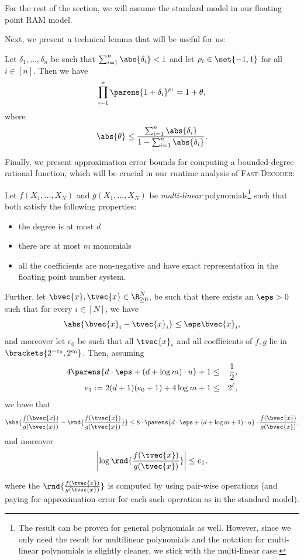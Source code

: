 \documentclass[11pt]{article}
\begin{document}
For the rest of the section, we will assume the standard model in our floating point RAM model.

Next, we present a technical lemma that will be useful for us:
\begin{lemma}
\label{lem:higham-bound}
    Let $\delta_1,\dots,\delta_n$ be such that $\sum_{i=1}^n  \abs{\delta_i}<1$ and let $\rho_i\in \set{-1,1}$ for all $i\in [n]$. Then we have
    \[\prod_{i=1}^n \parens{1+\delta_i}^{\rho_i} = 1 +\theta,\]
    where
    \[\abs{\theta} \le \frac{\sum_{i=1}^n  \abs{\delta_i}}{1-\sum_{i=1}^n  \abs{\delta_i}}.\]
\end{lemma}

Finally, we present approximation error bounds for computing a bounded-degree rational function, which will be crucial in our runtime analysis of \textsc{Fast-Decoder}:
\begin{lemma}
    \label{lem:rational-fn-error}
Let $f(X_1,\dots,X_N)$ and $g(X_1,\dots,X_N)$ be {\em multi-linear} polynomials\footnote{The result can be proven for general polynomials as well. However, since we only need the result for multilinear polynomials and the notation for multi-linear polynomials is slightly cleaner, we stick with the multi-linear case.} such that both satisfy the following properties:
\begin{itemize}
    \item the degree is at most $d$
    \item there are at most $m$ monomials
    \item all the coefficients are non-negative and have exact representation in the floating point number system.
\end{itemize}
Further, let $\bvec{x},\tvec{x}\in\R_{\ge 0}^N$, be such that there exists an $\eps>0$ such that for every $i\in [N]$, we have
\[ \abs{\bvec{x}_i-\tvec{x}_i}\le \eps \bvec{x}_i,\]
and moreover let $e_0$ be such that all $\tvec{x}_i$  and all coefficients of $f, g$ lie in $\brackets{2^{-e_0}, 2^{e_0}}$.
Then, assuming 
\begin{eqnarray}
    \label{eq:accuracy-pre-bound}
    4\parens{d\cdot \eps + (d+\log{m})\cdot u}+1& \le&  \frac 12, \\
\label{eq:range-pre-bound}
    e_1 := 2 (d+1)(e_0 + 1) + 4 \log m + 1  & \leq & 2^\ell,
\end{eqnarray}
we have that
\begin{equation}
    \label{eq:final-rational-fn-bound}
    \abs{\frac{f(\bvec{x})}{g(\bvec{x})} - \rnd{\frac{f(\tvec{x})}{g(\tvec{x})} } } 
\le 8 \cdot \parens{d\cdot \eps + (d+\log{m}+1)\cdot u} \cdot \frac{f(\bvec{x})}{g(\bvec{x})},
\end{equation}
 and moreover
\begin{equation}
\label{eq:range-post-bound}
    \left|\log \rnd{\frac{f(\tvec{x})}{g(\tvec{x})}}\right| \leq e_1,
\end{equation}

where the $\rnd{\frac{f(\tvec{x})}{g(\tvec{x})} }$ is computed by using pair-wise operations (and paying for approximation error for each such operation as in the standard model).

\end{lemma}
\end{document}

